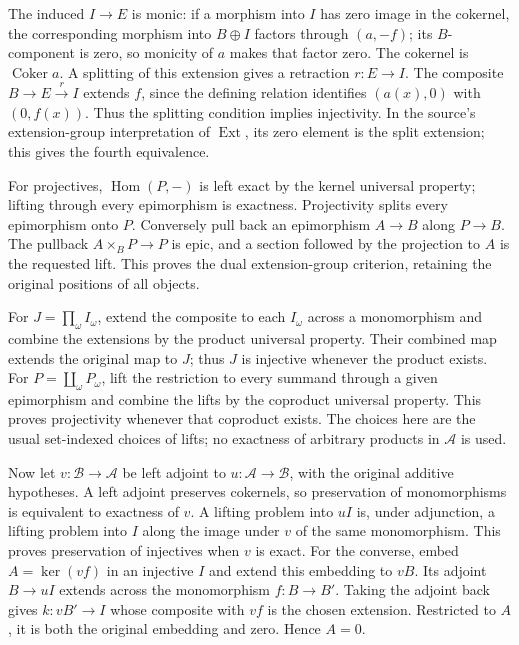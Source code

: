 \documentclass[11pt]{article}
\begin{document}
The induced \(I\to E\) is monic: if a morphism into \(I\) has zero image in the cokernel, the corresponding morphism into \(B\oplus I\) factors through \((a,-f)\); its \(B\)-component is zero, so monicity of \(a\) makes that factor zero. The cokernel is \(\operatorname{Coker}a\). A splitting of this extension gives a retraction \(r:E\to I\). The composite \(B\to E\xrightarrow r I\) extends \(f\), since the defining relation identifies \((a(x),0)\) with \((0,f(x))\). Thus the splitting condition implies injectivity. In the source's extension-group interpretation of \(\operatorname{Ext}\), its zero element is the split extension; this gives the fourth equivalence.

For projectives, \(\operatorname{Hom}(P,-)\) is left exact by the kernel universal property; lifting through every epimorphism is exactness. Projectivity splits every epimorphism onto \(P\). Conversely pull back an epimorphism \(A\to B\) along \(P\to B\). The pullback \(A\times_B P\to P\) is epic, and a section followed by the projection to \(A\) is the requested lift. This proves the dual extension-group criterion, retaining the original positions of all objects.

For \(J=\prod_\omega I_\omega\), extend the composite to each \(I_\omega\) across a monomorphism and combine the extensions by the product universal property. Their combined map extends the original map to \(J\); thus \(J\) is injective whenever the product exists. For \(P=\coprod_\omega P_\omega\), lift the restriction to every summand through a given epimorphism and combine the lifts by the coproduct universal property. This proves projectivity whenever that coproduct exists. The choices here are the usual set-indexed choices of lifts; no exactness of arbitrary products in \(\mathcal A\) is used.

Now let \(v:\mathcal B\to\mathcal A\) be left adjoint to \(u:\mathcal A\to\mathcal B\), with the original additive hypotheses. A left adjoint preserves cokernels, so preservation of monomorphisms is equivalent to exactness of \(v\). A lifting problem into \(uI\) is, under adjunction, a lifting problem into \(I\) along the image under \(v\) of the same monomorphism. This proves preservation of injectives when \(v\) is exact. For the converse, embed \(A=\ker(vf)\) in an injective \(I\) and extend this embedding to \(vB\). Its adjoint \(B\to uI\) extends across the monomorphism \(f:B\to B'\). Taking the adjoint back gives \(k:vB'\to I\) whose composite with \(vf\) is the chosen extension. Restricted to \(A\), it is both the original embedding and zero. Hence \(A=0\).
\end{document}
